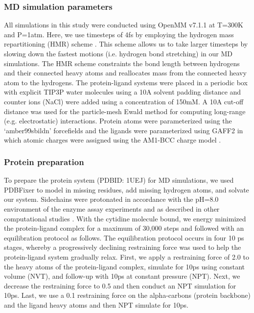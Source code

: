 \documentclass[fleqn,10pt]{wlscirep}
\begin{document}
\subsubsection{MD simulation parameters}
All simulations in this study were conducted using OpenMM v7.1.1 \cite{openmm} at T=300K and P=1atm.
Here, we use timesteps of 4fs by employing the hydrogen mass repartitioning (HMR) scheme \cite{hmr}. 
This scheme allows us to take larger timesteps by slowing down the fastest motions (i.e. hydrogen bond stretching) in our MD simulations.
The HMR scheme constraints the bond length between hydrogens and their connected heavy atoms and reallocates mass from the connected heavy atom to the hydrogens.
The protein-ligand systems were placed in a periodic box with explicit TIP3P water molecules using a 10A solvent padding distance and counter ions (NaCl) were added using a concentration of 150mM.
A 10A cut-off distance was used for the particle-mesh Ewald method for computing long-range (e.g. electrostatic) interactions.
Protein atoms were parameterized using the `amber99sbildn' forcefields \cite{amber99sbildn} and the ligands were parameterized using GAFF2 \cite{ambergaff} in which atomic charges were assigned using the AM1-BCC charge model \cite{am1bcc}.

\subsubsection{Protein preparation}
To prepare the protein system (PDBID: 1UEJ) for MD simulations, we used PDBFixer \cite{pdbfixer} to model in missing residues, add missing hydrogen atoms, and solvate our system.
Sidechains were protonated in accordance with the pH=8.0 environment of the enzyme assay experiments \cite{doi:10.1021/bi102054n} and as described in other computational studies \cite{tanaka2016molecular}.
With the cytidine molecule bound, we energy minimized the protein-ligand complex for a maximum of 30,000 steps and followed with an equilibration protocol as follows.
The equilibration protocol occurs in four 10 ps stages, whereby a progressively declining restraining force was used to help the protein-ligand system gradually relax.
First, we apply a restraining force of 2.0 to the heavy atoms of the protein-ligand complex, simulate for 10ps using constant volume (NVT), and follow-up with 10ps at constant pressure (NPT).
Next, we decrease the restraining force to 0.5 and then conduct an NPT simulation for 10ps.
Last, we use a 0.1 restraining force on the alpha-carbons (protein backbone) and the ligand heavy atoms and then NPT simulate for 10ps.
\end{document}
